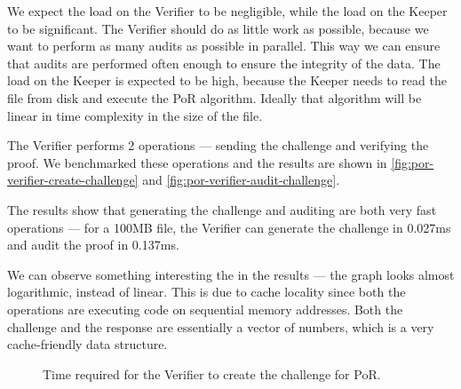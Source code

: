 We expect the load on the Verifier to be negligible, while the load on the Keeper to be significant.
The Verifier should do as little work as possible,
because we want to perform as many audits as possible in parallel.
This way we can ensure that audits are performed often enough to ensure the integrity of the data.
The load on the Keeper is expected to be high,
because the Keeper needs to read the file from disk and execute the PoR algorithm.
Ideally that algorithm will be linear in time complexity in the size of the file.

The Verifier performs 2 operations --- sending the challenge and verifying the proof.
We benchmarked these operations and the results are shown in \autoref{fig:por-verifier-create-challenge}
and \autoref{fig:por-verifier-audit-challenge}.

The results show that generating the challenge and auditing are both very fast operations ---
for a 100MB file, the Verifier can generate the challenge in 0.027ms and
audit the proof in 0.137ms.

We can observe something interesting the in the results ---
the graph looks almost logarithmic, instead of linear.
This is due to cache locality since both the operations are executing code on sequential memory addresses.
Both the challenge and the response are essentially a vector of numbers,
which is a very cache-friendly data structure.

\begin{figure}
  \myfloatalign
  \caption{Time required for the Verifier to create the challenge for PoR.}
  \label{fig:por-verifier-create-challenge}
\end{figure}

